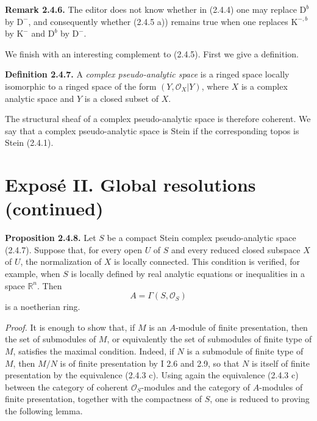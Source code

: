 \documentclass[11pt]{article}
\newcommand{\Spec}{\operatorname{Spec}}
\begin{document}
\textbf{Remark 2.4.6.} The editor does not know whether in (2.4.4) one may replace $\mathrm D^b$ by $\mathrm D^{-}$, and consequently whether (2.4.5 a)) remains true when one replaces $\mathrm K^{-,b}$ by $\mathrm K^{-}$ and $\mathrm D^b$ by $\mathrm D^{-}$.

We finish with an interesting complement to (2.4.5). First we give a definition.

\textbf{Definition 2.4.7.} A \emph{complex pseudo-analytic space} is a ringed space locally isomorphic to a ringed space of the form $(Y,\mathcal O_X|Y)$, where $X$ is a complex analytic space and $Y$ is a closed subset of $X$.

The structural sheaf of a complex pseudo-analytic space is therefore coherent. We say that a complex pseudo-analytic space is Stein if the corresponding topos is Stein (2.4.1).



\providecommand{\Qcoh}{\operatorname{Qcoh}}
\providecommand{\Mod}{\operatorname{Mod}}
\providecommand{\Coh}{\operatorname{Coh}}
\providecommand{\Ob}{\operatorname{Ob}}
\providecommand{\Hom}{\operatorname{Hom}}
\providecommand{\Ext}{\operatorname{Ext}}
\providecommand{\Spec}{\operatorname{Spec}}
\providecommand{\qcoh}{\mathrm{qcoh}}
\providecommand{\parf}{\mathrm{parf}}
\providecommand{\coh}{\mathrm{coh}}
\providecommand{\Loclib}{\operatorname{Loclib}}
\providecommand{\Lib}{\operatorname{Lib}}
\providecommand{\im}{\operatorname{Im}}

\section*{Exposé II. Global resolutions (continued)}

\textbf{Proposition 2.4.8.} Let $S$ be a compact Stein complex pseudo-analytic space (2.4.7). Suppose that, for every open $U$ of $S$ and every reduced closed subspace $X$ of $U$, the normalization of $X$ is locally connected. This condition is verified, for example, when $S$ is locally defined by real analytic equations or inequalities in a space $\mathbb R^n$. Then
\[
 A=\Gamma(S,\mathcal O_S)
\]
is a noetherian ring.

\emph{Proof.} It is enough to show that, if $M$ is an $A$-module of finite presentation, then the set of submodules of $M$, or equivalently the set of submodules of finite type of $M$, satisfies the maximal condition. Indeed, if $N$ is a submodule of finite type of $M$, then $M/N$ is of finite presentation by I 2.6 and 2.9, so that $N$ is itself of finite presentation by the equivalence (2.4.3 c). Using again the equivalence (2.4.3 c) between the category of coherent $\mathcal O_S$-modules and the category of $A$-modules of finite presentation, together with the compactness of $S$, one is reduced to proving the following lemma.
\end{document}
